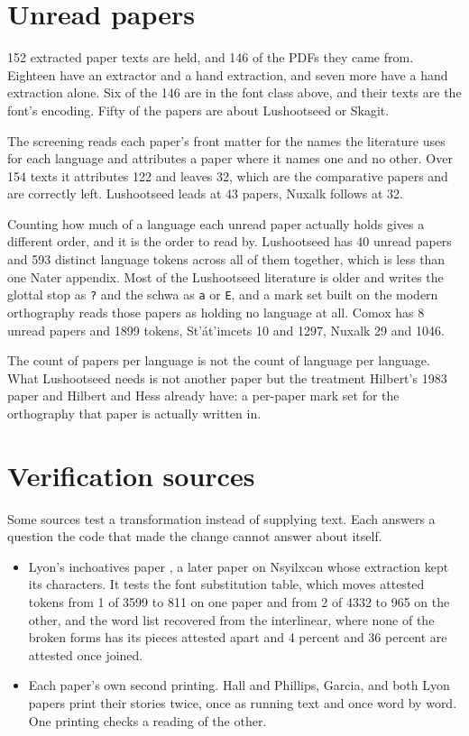 \section{Unread papers}

152 extracted paper texts are held, and 146 of the PDFs they came from. Eighteen have an extractor and a hand extraction, and seven more have a hand extraction alone. Six of the 146 are in the font class above, and their texts are the font's encoding. Fifty of the papers are about Lushootseed or Skagit.

The screening reads each paper's front matter for the names the literature uses for each language and attributes a paper where it names one and no other. Over 154 texts it attributes 122 and leaves 32, which are the comparative papers and are correctly left. Lushootseed leads at 43 papers, Nuxalk follows at 32.

Counting how much of a language each unread paper actually holds gives a different order, and it is the order to read by. Lushootseed has 40 unread papers and 593 distinct language tokens across all of them together, which is less than one Nater appendix. Most of the Lushootseed literature is older and writes the glottal stop as \texttt{?} and the schwa as \texttt{a} or \texttt{E}, and a mark set built on the modern orthography reads those papers as holding no language at all. Comox has 8 unread papers and 1899 tokens, St'át'imcets 10 and 1297, Nuxalk 29 and 1046.

The count of papers per language is not the count of language per language. What Lushootseed needs is not another paper but the treatment Hilbert's 1983 paper and Hilbert and Hess already have: a per-paper mark set for the orthography that paper is actually written in.

\section{Verification sources}

Some sources test a transformation instead of supplying text. Each answers a question the code that made the change cannot answer about itself.

\begin{itemize}
\item Lyon's inchoatives paper \cite{src:Lyon-2025}, a later paper on Nsyilxcən whose extraction kept its characters. It tests the font substitution table, which moves attested tokens from 1 of 3599 to 811 on one paper and from 2 of 4332 to 965 on the other, and the word list recovered from the interlinear, where none of the broken forms has its pieces attested apart and 4 percent and 36 percent are attested once joined.
\item Each paper's own second printing. Hall and Phillips, Garcia, and both Lyon papers print their stories twice, once as running text and once word by word. One printing checks a reading of the other.
\end{itemize}

